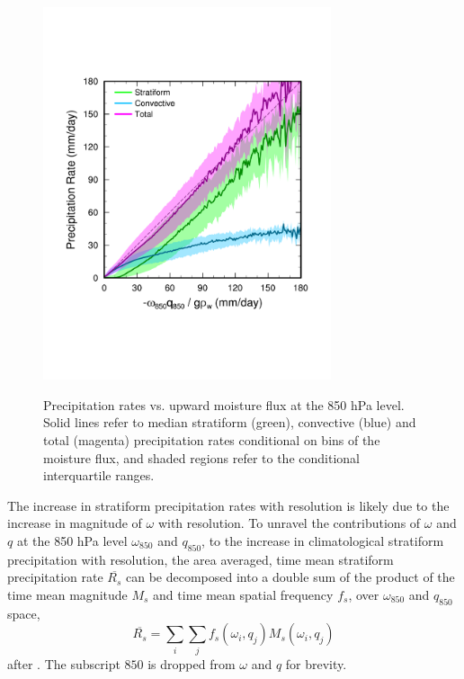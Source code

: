 \documentclass[times]{qjrms4}
\begin{document}
\begin{figure}
\begin{center}
\noindent\includegraphics[width=20pc,angle=0]{figs/temp_mflux.pdf}\\
\end{center}
\caption{Precipitation rates vs. upward moisture flux at the 850 hPa level. Solid lines refer to median stratiform (green), convective (blue) and total (magenta) precipitation rates conditional on bins of the moisture flux, and shaded regions refer to the conditional interquartile ranges.}
\label{fig:mflux}
\end{figure}

The increase in stratiform precipitation rates with resolution is likely due to the increase in magnitude of $\omega$ with resolution. To unravel the contributions of $\omega$ and $q$ at the 850 hPa level $\omega_{850}$ and $q_{850}$, to the increase in climatological stratiform precipitation with resolution, the area averaged, time mean stratiform precipitation rate $\overline{R_{s}}$ can be decomposed into a double sum of the product of the time mean magnitude $M_s$ and time mean spatial frequency $f_s$, over $\omega_{850}$ and $q_{850}$ space,
\begin{equation}
\overline{R_{s}} = \sum_i \sum_j f_s \left( \omega_i , q_j \right) M_s \left( \omega_i , q_j \right) \label{eq:pdecomp}
\end{equation}
after \cite{TETAL2018CD}. The subscript $850$ is dropped from $\omega$ and $q$ for brevity. 
\end{document}
